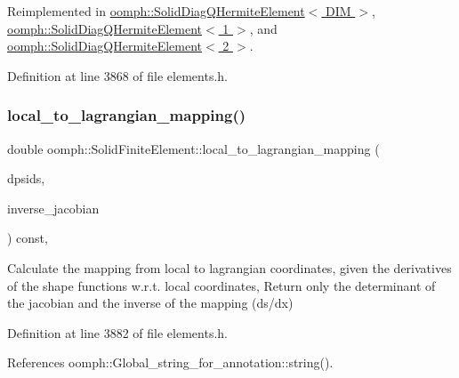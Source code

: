 Reimplemented in \hyperlink{classoomph_1_1SolidDiagQHermiteElement_a781e03c735c8c17533315781982882e1}{oomph\+::\+Solid\+Diag\+Q\+Hermite\+Element$<$ D\+I\+M $>$}, \hyperlink{classoomph_1_1SolidDiagQHermiteElement_a781e03c735c8c17533315781982882e1}{oomph\+::\+Solid\+Diag\+Q\+Hermite\+Element$<$ 1 $>$}, and \hyperlink{classoomph_1_1SolidDiagQHermiteElement_a781e03c735c8c17533315781982882e1}{oomph\+::\+Solid\+Diag\+Q\+Hermite\+Element$<$ 2 $>$}.



Definition at line 3868 of file elements.\+h.

\mbox{\label{classoomph_1_1SolidFiniteElement_afa4031c891a8a86fa27e2339ff923ebc}} 
\subsubsection{\texorpdfstring{local\+\_\+to\+\_\+lagrangian\+\_\+mapping()}{local\_to\_lagrangian\_mapping()}\hspace{0.1cm}{\footnotesize\ttfamily [2/2]}}
{\footnotesize\ttfamily double oomph\+::\+Solid\+Finite\+Element\+::local\+\_\+to\+\_\+lagrangian\+\_\+mapping (\begin{DoxyParamCaption}\item[{const \hyperlink{classoomph_1_1DShape}{D\+Shape} \&}]{dpsids,  }\item[{\hyperlink{classoomph_1_1DenseMatrix}{Dense\+Matrix}$<$ double $>$ \&}]{inverse\+\_\+jacobian }\end{DoxyParamCaption}) const\hspace{0.3cm}{\ttfamily [inline]}, {\ttfamily [protected]}}



Calculate the mapping from local to lagrangian coordinates, given the derivatives of the shape functions w.\+r.\+t. local coordinates, Return only the determinant of the jacobian and the inverse of the mapping (ds/dx) 



Definition at line 3882 of file elements.\+h.



References oomph\+::\+Global\+\_\+string\+\_\+for\+\_\+annotation\+::string().

